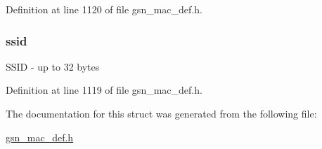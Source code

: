 Definition at line 1120 of file gsn\_\-mac\_\-def.h.

\hypertarget{a00130_a1bc7788a828e29446580aa10a5ac2932}{
\subsubsection[{ssid}]{ {\bf ssid}}}
\label{a00130_a1bc7788a828e29446580aa10a5ac2932}
SSID -\/ up to 32 bytes 

Definition at line 1119 of file gsn\_\-mac\_\-def.h.



The documentation for this struct was generated from the following file:\begin{DoxyCompactItemize}
\item 
\hyperlink{a00522}{gsn\_\-mac\_\-def.h}\end{DoxyCompactItemize}
